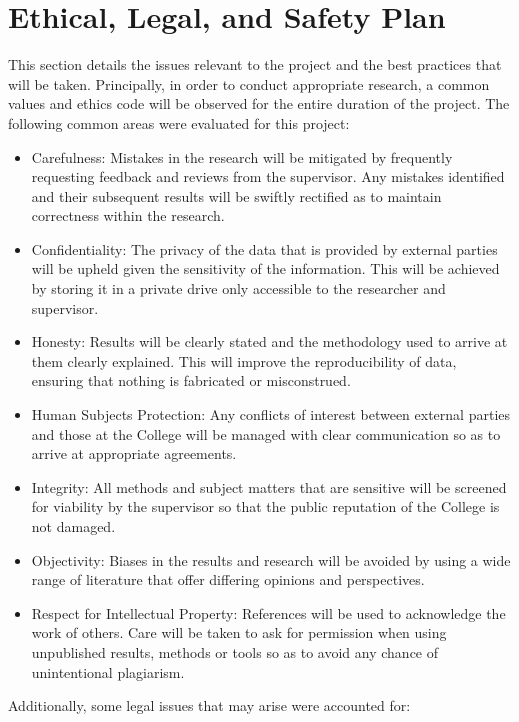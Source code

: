 \documentclass[10pt,onecolumn,letterpaper]{article}
\begin{document}
\section{Ethical, Legal, and Safety Plan}

This section details the issues relevant to the project and the best practices that will be taken. Principally, in order to conduct appropriate research, a common values and ethics code will be observed for the entire duration of the project. The following common areas were evaluated for this project: 

\begin{itemize}
	\item Carefulness: Mistakes in the research will be mitigated by frequently requesting feedback and reviews from the supervisor. Any mistakes identified and their subsequent results will be swiftly rectified as to maintain correctness within the research. 
	\item Confidentiality: The privacy of the data that is provided by external parties will be upheld given the sensitivity of the information. This will be achieved by storing it in a private drive only accessible to the researcher and supervisor. 
	\item Honesty: Results will be clearly stated and the methodology used to arrive at them clearly explained. This will improve the reproducibility of data, ensuring that nothing is fabricated or misconstrued. 
	\item Human Subjects Protection: Any conflicts of interest between external parties and those at the College will be managed with clear communication so as to arrive at appropriate agreements.
	\item Integrity: All methods and subject matters that are sensitive will be screened for viability by the supervisor so that the public reputation of the College is not damaged. 
	\item Objectivity: Biases in the results and research will be avoided by using a wide range of literature that offer differing opinions and perspectives. 
	\item Respect for Intellectual Property: References will be used to acknowledge the work of others. Care will be taken to ask for permission when using unpublished results, methods or tools so as to avoid any chance of unintentional plagiarism. 
\end{itemize}

Additionally, some legal issues that may arise were accounted for: 
\end{document}
